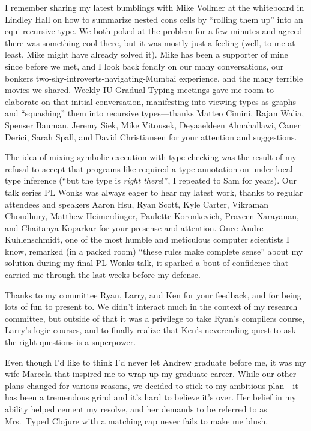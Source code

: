 I remember sharing my latest bumblings with Mike Vollmer at the whiteboard in Lindley Hall
on how to summarize nested cons cells by ``rolling them up'' into an equi-recursive type.
We both poked at the problem for a few minutes and agreed there was something cool there,
but it was mostly just a feeling (well, to me at least, Mike might have already solved it).
Mike has been a supporter of mine since before we met, and I look back fondly on our
many conversations, our bonkers two-shy-introverts-navigating-Mumbai experience,
and the many terrible movies we shared.
Weekly IU Gradual Typing meetings
gave me room to elaborate on that initial conversation, manifesting into
viewing types as graphs and ``squashing'' them into recursive types---thanks
Matteo Cimini, Rajan Walia, Spenser Bauman, Jeremy Siek, Mike Vitousek, Deyaaeldeen Almahallawi,
Caner Derici, Sarah Spall, and David Christiansen
for your attention and suggestions.

The idea of mixing symbolic execution with type checking was the result of my refusal
to accept that programs like  required a type annotation
on  under local type inference
(``but the type is \emph{right there}!'', I repeated to Sam for years).
Our talk series PL Wonks was always eager to hear my latest work,
thanks to regular attendees and speakers Aaron Hsu, Ryan Scott, Kyle Carter, 
Vikraman Choudhury, Matthew Heimerdinger, Paulette Koronkevich, Praveen Narayanan,
and
Chaitanya Koparkar for your presense and attention.
Once Andre Kuhlenschmidt, one of the most humble and meticulous computer scientists
I know, remarked (in a packed room) ``these rules make complete sense'' 
about my solution during my final PL Wonks talk,
it sparked a bout of confidence that carried
me through the last weeks before my defense.

Thanks to my committee Ryan, Larry, and Ken for your feedback, and for being
lots of fun to present to.
We didn't interact much in the context of my research committee, but outside of that
it was a privilege to take Ryan's compilers course, Larry's logic courses,
and to finally realize that Ken's neverending quest to ask the right questions
is a superpower.

Even though I'd like to think I'd never let Andrew graduate before me,
it was my wife Marcela that inspired me to wrap up my graduate career.
While our other plans changed for various reasons, we decided to stick to
my ambitious plan---it has been a tremendous grind and it's hard to believe
it's over.  Her belief in my ability helped cement my resolve, and her demands
to be referred to as Mrs.~Typed Clojure with a matching cap never
fails to make me blush.
